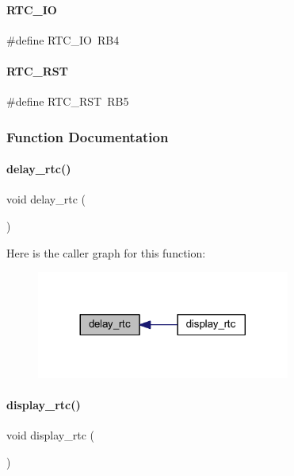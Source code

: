 \paragraph{R\+T\+C\+\_\+\+IO}
{\footnotesize\ttfamily \#define R\+T\+C\+\_\+\+IO~R\+B4}

\mbox{\label{a00044_a1615ada9d76f57d41ce419e9e1e25c8b}} 
\paragraph{R\+T\+C\+\_\+\+R\+ST}
{\footnotesize\ttfamily \#define R\+T\+C\+\_\+\+R\+ST~R\+B5}



\subsubsection{Function Documentation}
\mbox{\label{a00044_a30a11d605a2fcfe8fc79c4f0a17a20cf}} 
\paragraph{delay\+\_\+rtc()}
{\footnotesize\ttfamily void delay\+\_\+rtc (\begin{DoxyParamCaption}{ }\end{DoxyParamCaption})}

Here is the caller graph for this function\+:
\nopagebreak
\begin{figure}[H]
\begin{center}
\leavevmode
\includegraphics[width=236pt]{a00044_a30a11d605a2fcfe8fc79c4f0a17a20cf_icgraph}
\end{center}
\end{figure}
\mbox{\label{a00044_a304536cc402df7d7fc7328f36f746f16}} 
\paragraph{display\+\_\+rtc()}
{\footnotesize\ttfamily void display\+\_\+rtc (\begin{DoxyParamCaption}{ }\end{DoxyParamCaption})}

